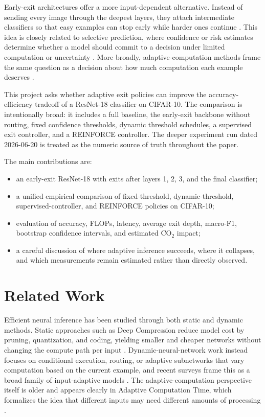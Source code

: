 \documentclass[10pt,twocolumn]{article}
\newcommand{\dataset}{CIFAR-10}
\newcommand{\backbone}{ResNet-18}
\begin{document}
Early-exit architectures offer a more input-dependent alternative. Instead of sending every image through the deepest layers, they attach intermediate classifiers so that easy examples can stop early while harder ones continue \cite{teerapittayanon2017branchynet,huang2017multiscale}. This idea is closely related to selective prediction, where confidence or risk estimates determine whether a model should commit to a decision under limited computation or uncertainty \cite{geifman2017selective}. More broadly, adaptive-computation methods frame the same question as a decision about how much computation each example deserves \cite{graves2016adaptive}.

This project asks whether adaptive exit policies can improve the accuracy-efficiency tradeoff of a \backbone{} classifier on \dataset{}. The comparison is intentionally broad: it includes a full baseline, the early-exit backbone without routing, fixed confidence thresholds, dynamic threshold schedules, a supervised exit controller, and a REINFORCE controller. The deeper experiment run dated 2026-06-20 is treated as the numeric source of truth throughout the paper.

The main contributions are:
\begin{itemize}
    \item an early-exit \backbone{} with exits after layers 1, 2, 3, and the final classifier;
    \item a unified empirical comparison of fixed-threshold, dynamic-threshold, supervised-controller, and REINFORCE policies on \dataset{};
    \item evaluation of accuracy, FLOPs, latency, average exit depth, macro-F1, bootstrap confidence intervals, and estimated CO$_2$ impact;
    \item a careful discussion of where adaptive inference succeeds, where it collapses, and which measurements remain estimated rather than directly observed.
\end{itemize}

\section{Related Work}

Efficient neural inference has been studied through both static and dynamic methods. Static approaches such as Deep Compression reduce model cost by pruning, quantization, and coding, yielding smaller and cheaper networks without changing the compute path per input \cite{han2015deep}. Dynamic-neural-network work instead focuses on conditional execution, routing, or adaptive subnetworks that vary computation based on the current example, and recent surveys frame this as a broad family of input-adaptive models \cite{han2021dynamic}. The adaptive-computation perspective itself is older and appears clearly in Adaptive Computation Time, which formalizes the idea that different inputs may need different amounts of processing \cite{graves2016adaptive}.
\end{document}
